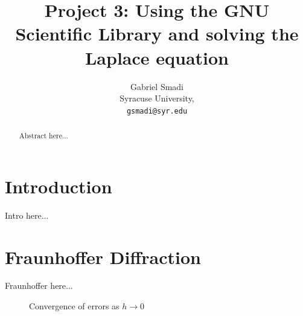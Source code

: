 \documentclass{article}
\begin{document}
\title{Project 3: Using the GNU Scientific Library and solving the Laplace equation }

\author{Gabriel Smadi\\
  Syracuse University,\\
  \texttt{gsmadi@syr.edu}}
\maketitle

\begin{abstract}
Abstract here...
\end{abstract}

\section{Introduction}

Intro here...

\section{Fraunhoffer Diffraction}

Fraunhoffer here...

\begin{figure}[H]
  \begin{center}
  \end{center}
  \caption{Convergence of errors as $h\to 0$}
  \label{fig:mag_susc}
\end{figure}
\end{document}
